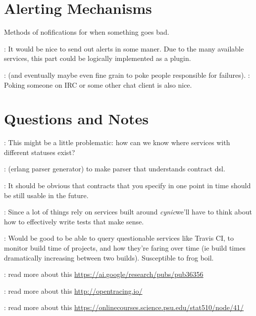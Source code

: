 \documentclass[12pt,twoside]{article}
\newcommand{\projectname}[0]{\textit{cynic}}
\begin{document}
\section{Alerting Mechanisms}
Methods of nofifications for when something goes bad.
\begin{itemize}
  : It would be nice to send out
    alerts in some maner. Due to the many available services, this
    part could be logically implemented as a plugin.
  \begin{itemize}
    : (and eventually maybe even fine grain to
      poke people responsible for failures).
    : Poking someone on IRC or some
      other chat client is also nice.
  \end{itemize}
\end{itemize}

\section{Questions and Notes}
\begin{itemize}
  : This might be a little problematic: how can
    we know where services with different statuses exist?

  : (erlang parser generator) to make parser that
    understands contract dsl.

  : It should be obvious that
    contracts that you specify in one point in time should be still
    usable in the future.

  : Since a lot of things rely on services
    built around \projectname we'll have to think about how to
    effectively write tests that make sense.

  : Would be good to be able to query
    questionable services like Travis CI, to monitor build time of
    projects, and how they're faring over time (ie build times
    dramatically increasing between two builds). Susceptible to frog
    boil.

  : read more about this \url{https://ai.google/research/pubs/pub36356}

  : read more about this \url{http://opentracing.io/}

  : read more about this \url{https://onlinecourses.science.psu.edu/stat510/node/41/}

\end{itemize}
\end{document}
